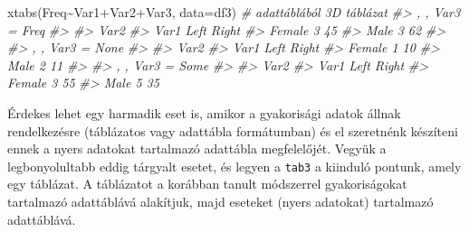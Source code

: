 \documentclass[
]{book}
\newenvironment{Shaded}{\begin{snugshade}}{\end{snugshade}}
\newcommand{\AttributeTok}[1]{\textcolor[rgb]{0.77,0.63,0.00}{#1}}
\newcommand{\CommentTok}[1]{\textcolor[rgb]{0.56,0.35,0.01}{\textit{#1}}}
\newcommand{\FunctionTok}[1]{\textcolor[rgb]{0.00,0.00,0.00}{#1}}
\newcommand{\NormalTok}[1]{#1}
\newcommand{\SpecialCharTok}[1]{\textcolor[rgb]{0.00,0.00,0.00}{#1}}
\begin{document}
\begin{Shaded}
\begin{Highlighting}[]
\FunctionTok{xtabs}\NormalTok{(Freq}\SpecialCharTok{\textasciitilde{}}\NormalTok{Var1}\SpecialCharTok{+}\NormalTok{Var2}\SpecialCharTok{+}\NormalTok{Var3, }\AttributeTok{data=}\NormalTok{df3) }\CommentTok{\# adattáblából 3D táblázat}
\CommentTok{\#\textgreater{} , , Var3 = Freq}
\CommentTok{\#\textgreater{} }
\CommentTok{\#\textgreater{}         Var2}
\CommentTok{\#\textgreater{} Var1     Left Right}
\CommentTok{\#\textgreater{}   Female    3    45}
\CommentTok{\#\textgreater{}   Male      3    62}
\CommentTok{\#\textgreater{} }
\CommentTok{\#\textgreater{} , , Var3 = None}
\CommentTok{\#\textgreater{} }
\CommentTok{\#\textgreater{}         Var2}
\CommentTok{\#\textgreater{} Var1     Left Right}
\CommentTok{\#\textgreater{}   Female    1    10}
\CommentTok{\#\textgreater{}   Male      2    11}
\CommentTok{\#\textgreater{} }
\CommentTok{\#\textgreater{} , , Var3 = Some}
\CommentTok{\#\textgreater{} }
\CommentTok{\#\textgreater{}         Var2}
\CommentTok{\#\textgreater{} Var1     Left Right}
\CommentTok{\#\textgreater{}   Female    3    55}
\CommentTok{\#\textgreater{}   Male      5    35}
\end{Highlighting}
\end{Shaded}

Érdekes lehet egy harmadik eset is, amikor a gyakorisági adatok állnak rendelkezésre (táblázatos vagy adattábla formátumban) és el szeretnénk készíteni ennek a nyers adatokat tartalmazó adattábla megfelelőjét. Vegyük a legbonyolultabb eddig tárgyalt esetet, és legyen a \texttt{tab3} a kiinduló pontunk, amely egy táblázat. A táblázatot a korábban tanult módszerrel gyakoriságokat tartalmazó adattáblává alakítjuk, majd eseteket (nyers adatokat) tartalmazó adattáblává.
\end{document}
